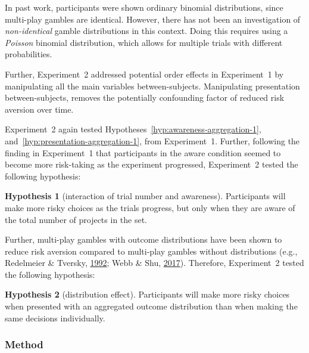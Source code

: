 \documentclass[
  english,
  man, donotrepeattitle,floatsintext]{apa7}
\theoremstyle{definition}
\theoremstyle{definition}
\theoremstyle{definition}
\theoremstyle{definition}
\newtheorem{hypothesis}{Hypothesis}
\theoremstyle{remark}
\begin{document}
In past work, participants were shown ordinary binomial distributions, since
multi-play gambles are identical. However, there has not been an investigation
of \emph{non-identical} gamble distributions in this context. Doing this requires
using a \emph{Poisson} binomial distribution, which allows for multiple trials with
different probabilities.

Further, Experiment~2 addressed potential order effects in Experiment~1 by
manipulating all the main variables between-subjects. Manipulating presentation
between-subjects, removes the potentially confounding factor of reduced risk
aversion over time.

Experiment~2 again tested Hypotheses~\ref{hyp:awareness-aggregation-1},
and~\ref{hyp:presentation-aggregation-1}, from Experiment~1. Further, following
the finding in Experiment~1 that participants in the aware condition seemed to
become more risk-taking as the experiment progressed, Experiment~2 tested the
following hypothesis:

\begin{hypothesis}[interaction of trial number and awareness]
\protect\hypertarget{hyp:awareness-trials-aggregation-2}{}{\label{hyp:awareness-trials-aggregation-2} \iffalse (interaction of trial number and awareness) \fi{} }Participants will make more risky choices as the trials progress, but only when
they are aware of the total number of projects in the set.
\end{hypothesis}

Further, multi-play gambles with outcome distributions have been shown to reduce
risk aversion compared to multi-play gambles without distributions (e.g., Redelmeier \& Tversky, \protect\hyperlink{ref-redelmeier1992}{1992}; Webb \& Shu, \protect\hyperlink{ref-webb2017}{2017}). Therefore, Experiment~2 tested the following
hypothesis:

\begin{hypothesis}[distribution effect]
\protect\hypertarget{hyp:distribution-aggregation-2}{}{\label{hyp:distribution-aggregation-2} \iffalse (distribution effect) \fi{} }Participants will make more risky choices when presented with an aggregated
outcome distribution than when making the same decisions individually.
\end{hypothesis}

\hypertarget{method-1}{%
\subsubsection{Method}\label{method-1}}
\end{document}
